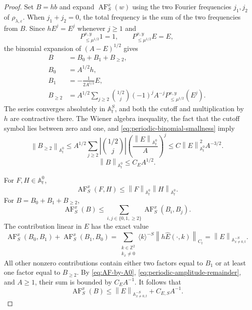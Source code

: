\documentclass[12pt,reqno,letterpaper]{amsart}
\numberwithin{equation}{section}
\theoremstyle{definition}
\newcommand{\Z}{\mathbb Z}
\newcommand{\A}{\mathbb A}
\newcommand{\eps}{\varepsilon}
\newcommand{\la}{\lambda}
\newcommand{\norm}[1]{\left\lVert #1\right\rVert}
\newcommand{\abs}[1]{\left\lvert #1\right\rvert}
\begin{document}
\begin{proof}
Set $B=hb$ and expand $\operatorname{AF}_S^x(w)$ using the two Fourier
frequencies $j_1,j_2$ of $\rho_{\la,\eps}$.  When $j_1+j_2=0$, the total
frequency is the sum of the two frequencies from $B$.
Since $hE^j=E^j$ whenever $j\geq1$ and
\[
 P_{\leq\mu^{1/2}}^{x,y}1=1,
 \qquad P_{\leq\mu^{1/2}}^{x,y}E=E,
\]
the binomial expansion of $(A-E)^{1/2}$ gives
\begin{equation*}
\begin{split}
   B&=B_0+B_1+B_{\geq2},\\
   B_0&=A^{1/2}h,\\
   B_1&=-\frac{1}{2A^{1/2}}E,\\
   B_{\geq2}
      &=A^{1/2}\sum_{j\geq2}\binom{1/2}{j}(-1)^jA^{-j}
           P_{\leq\mu^{1/2}}^{x,y}(E^j).
\end{split}
\end{equation*}
The series converges absolutely in $\A^S_t$, and both the cutoff and
multiplication by $h$ are contractive there.
The Wiener algebra inequality, the fact that the
cutoff symbol lies between zero and one, and
\eqref{eq:periodic-binomial-smallness} imply
\begin{equation}\label{eq:periodic-amplitude-remainder}
 \norm{B_{\geq2}}_{\A^0_t}
 \leq A^{1/2}\sum_{j\geq2}
          \abs{\binom{1/2}{j}}
          \left(\frac{\norm E_{\A^0_t}}{A}\right)^j
 \leq C\norm E_{\A^0_t}^2A^{-3/2}.
\end{equation}
\begin{equation}\label{eq:periodic-amplitude-A0}
   \norm{B}_{\A^0_t}\leq C_EA^{1/2}.
\end{equation}

For $F,H\in\A^0_t$,
\begin{equation}\label{eq:AF-by-A0}
   \operatorname{AF}_S^x(F,H)
      \leq\norm{F}_{\A^0_t}\norm{H}_{\A^0_t}.
\end{equation}
For $B=B_0+B_1+B_{\geq2}$,
\begin{equation*}
   \operatorname{AF}_S^x(B)
      \leq\sum_{i,j\in\{0,1,\geq2\}}
          \operatorname{AF}_S^x(B_i,B_j).
\end{equation*}
The contribution linear in $E$ has the exact value
\begin{equation*}
   \operatorname{AF}_S^x(B_0,B_1)
       +\operatorname{AF}_S^x(B_1,B_0)
   =\sum_{\substack{k\in\Z^2\\k_x\neq0}}
       \langle k\rangle^{-S}
       \norm{h\widehat E(\cdot,k)}_{C_t}
     =\norm{E}_{\A^{-S}_{x\neq0,t}}.
\end{equation*}
All other nonzero contributions contain either two factors equal to $B_1$ or
at least one factor equal to $B_{\geq2}$.  By
\eqref{eq:AF-by-A0}, \eqref{eq:periodic-amplitude-remainder}, and $A\geq1$,
their sum is bounded by $C_EA^{-1}$.  It follows that
\begin{equation}\label{eq:periodic-amplitude-AF}
   \operatorname{AF}_S^x(B)
      \leq\norm{E}_{\A^{-S}_{x\neq0,t}}+C_{E,S}A^{-1}.
\end{equation}


\end{proof}
\end{document}
